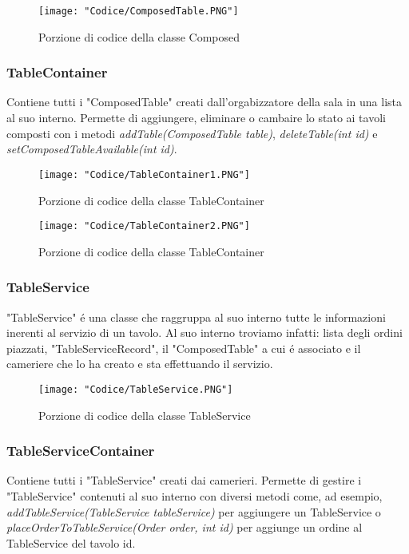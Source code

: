\documentclass{article}
\begin{document}
\begin{figure}[!h]
\centering
\texttt{[image: "Codice/ComposedTable.PNG"]}
\caption{Porzione di codice della classe Composed}
\end{figure}

\subsubsection{TableContainer}

Contiene tutti i "ComposedTable" creati dall'orgabizzatore della sala in una lista al suo interno. Permette di aggiungere, eliminare o cambaire lo stato ai tavoli composti con i metodi \textit{addTable(ComposedTable table)}, \textit{deleteTable(int id)} e \textit{setComposedTableAvailable(int id)}.

\begin{figure}[!h]
\centering
\texttt{[image: "Codice/TableContainer1.PNG"]}
\caption{Porzione di codice della classe TableContainer}
\end{figure}


\begin{figure}[!h]
\centering
\texttt{[image: "Codice/TableContainer2.PNG"]}
\caption{Porzione di codice della classe TableContainer}
\end{figure}

\newpage

\subsubsection{TableService}

"TableService" \'e una classe che raggruppa al suo interno tutte le informazioni inerenti al servizio di un tavolo. Al suo interno troviamo infatti: lista degli ordini piazzati, "TableServiceRecord", il "ComposedTable" a cui \'e associato e il cameriere che lo ha creato e sta effettuando il servizio.


\begin{figure}[!h]
\centering
\texttt{[image: "Codice/TableService.PNG"]}
\caption{Porzione di codice della classe TableService}
\end{figure}

\subsubsection{TableServiceContainer}

Contiene tutti i "TableService" creati dai camerieri. Permette di gestire i "TableService" contenuti al suo interno con diversi metodi come, ad esempio, \textit{addTableService(TableService tableService)} per aggiungere un TableService o \textit{placeOrderToTableService(Order order, int id)} per aggiunge un ordine al TableService del tavolo id.
\end{document}
